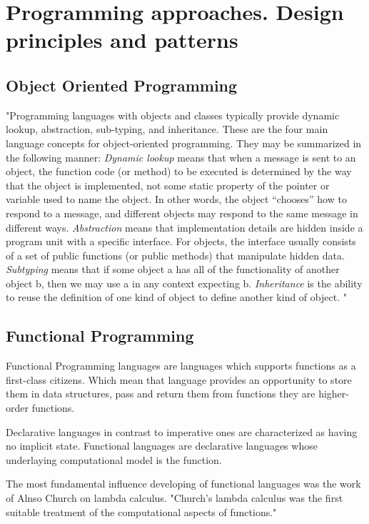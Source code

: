 \chapter{Programming approaches. Design principles and patterns}
\section{Object Oriented Programming}
"Programming languages with objects and classes typically provide dynamic lookup, abstraction, sub-typing, and inheritance. These are the four main language concepts for object-oriented programming. They may be summarized in the following manner:
\textit{Dynamic lookup} means that when a message is sent to an object, the function code (or method) to be executed is determined by the way that the object is implemented, not some static property of the pointer or variable used to name the object. In other words, the object “chooses” how to respond to a message, and different objects may respond to the same message in different ways.
\textit{Abstraction} means that implementation details are hidden inside a program unit with a specific interface. For objects, the interface usually consists of a set of public functions (or public methods) that manipulate hidden data.
\textit{Subtyping} means that if some object a has all of the functionality of another object b, then we may use a in any context expecting b.
\textit{Inheritance} is the ability to reuse the definition of one kind of object to define another kind of object.
"\cite{concepts}

\section{Functional Programming}
Functional Programming languages are languages which supports functions as a first-class citizens. Which mean that language provides an opportunity to store them in data structures, pass and return them from functions they are higher-order functions\cite{Hudak}.

Declarative languages in contrast to imperative ones  are characterized as having no implicit state. Functional languages are declarative languages whose underlaying computational model is the function.\cite{Hudak}

The most fundamental influence developing of functional languages was the work of Alnso Church on lambda calculus. "Church’s lambda calculus was the first suitable treatment of the computational aspects of functions."\cite{Hudak}\\

